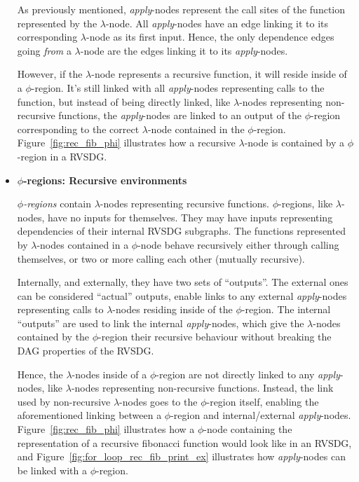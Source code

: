 \begin{itemize}
As previously mentioned, \textit{apply}-nodes represent the call sites of the
function represented by the $\lambda$-node. All \textit{apply}-nodes have an
edge linking it to its corresponding $\lambda$-node as its first input. Hence,
the only dependence edges going \textit{from} a $\lambda$-node are the edges
linking it to its \textit{apply}-nodes.

However, if the $\lambda$-node represents a recursive function, it will reside
inside of a $\phi$-region. It's still linked with all \textit{apply}-nodes
representing calls to the function, but instead of being directly linked, like
$\lambda$-nodes representing non-recursive functions, the \textit{apply}-nodes
are linked to an output of the $\phi$-region corresponding to the correct
$\lambda$-node contained in the $\phi$-region. Figure~\ref{fig:rec_fib_phi}
illustrates how a recursive $\lambda$-node is contained by a $\phi$-region in a
RVSDG.

\item \textbf{$\phi$-regions: Recursive environments}

\textit{$\phi$-regions} contain $\lambda$-nodes representing recursive
functions. $\phi$-regions, like $\lambda$-nodes, have no inputs for themselves.
They may have inputs representing dependencies of their internal RVSDG
subgraphs. The functions represented by $\lambda$-nodes contained in a
$\phi$-node behave recursively either through calling themselves, or two or more
calling each other (mutually recursive).

Internally,
and externally, they have two sets of ``outputs''. The external ones can be
considered ``actual'' outputs, enable links to any external \textit{apply}-nodes
representing calls to $\lambda$-nodes residing inside of the $\phi$-region. The
internal ``outputs'' are used to link the internal \textit{apply}-nodes, which
give the $\lambda$-nodes contained by the $\phi$-region their recursive
behaviour without breaking the DAG properties of the RVSDG.

Hence, the $\lambda$-nodes inside of a $\phi$-region are not directly linked to
any \textit{apply}-nodes, like $\lambda$-nodes representing non-recursive
functions. Instead, the link used by non-recursive $\lambda$-nodes goes to the
$\phi$-region itself, enabling the aforementioned linking between a
$\phi$-region and internal/external \textit{apply}-nodes.
Figure~\ref{fig:rec_fib_phi} illustrates how a $\phi$-node containing the
representation of a recursive fibonacci function would look like in an RVSDG,
and Figure~\ref{fig:for_loop_rec_fib_print_ex} illustrates how
\textit{apply}-nodes can be linked with a $\phi$-region.

\end{itemize}

